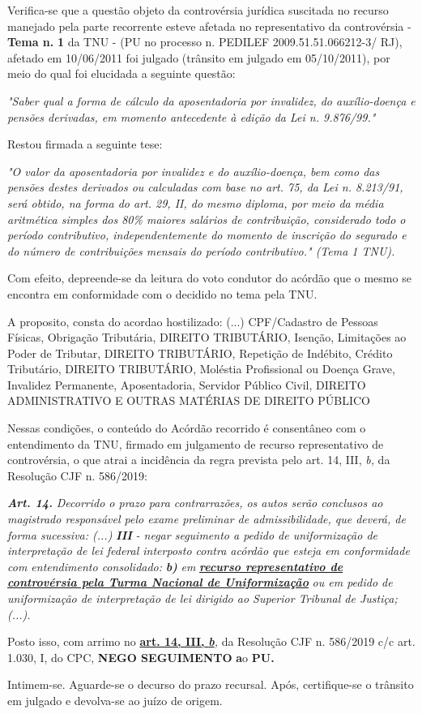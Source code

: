 \documentclass[12pt]{article}
\begin{document}
\justifying
\noindent Verifica-se que a questão objeto da controvérsia jurídica suscitada no recurso manejado pela parte recorrente esteve afetada no representativo da controvérsia - \textbf{Tema n. }\textbf{1} da TNU - (PU no processo n. PEDILEF 2009.51.51.066212-3/ RJ),  afetado em 10/06/2011 foi julgado (trânsito em julgado em 05/10/2011), por meio do qual foi elucidada a seguinte questão:

\noindent \textit{"Saber qual a forma de cálculo da aposentadoria por invalidez, do auxílio-doença e pensões derivadas, em momento antecedente à edição da Lei n. 9.876/99."}

\noindent Restou firmada a seguinte tese:

\noindent \textit{"O valor da aposentadoria por invalidez e do auxílio-doença, bem como das pensões destes derivados ou calculadas com base no art. 75, da Lei n. 8.213/91, será obtido, na forma do art. 29, II, do mesmo diploma, por meio da média aritmética simples dos 80\% maiores salários de contribuição, considerado todo o período contributivo, independentemente do momento de inscrição do segurado e do número de contribuições mensais do período contributivo." (Tema 1 TNU).}

\noindent Com efeito, depreende-se da leitura do voto condutor do acórdão que o mesmo se encontra em conformidade com o decidido no  tema pela TNU.

\noindent A proposito, consta do acordao hostilizado: (...) CPF/Cadastro de Pessoas Físicas, Obrigação Tributária, DIREITO TRIBUTÁRIO, Isenção, Limitações ao Poder de Tributar, DIREITO TRIBUTÁRIO, Repetição de Indébito, Crédito Tributário, DIREITO TRIBUTÁRIO, Moléstia Profissional ou Doença Grave, Invalidez Permanente, Aposentadoria, Servidor Público Civil, DIREITO ADMINISTRATIVO E OUTRAS MATÉRIAS DE DIREITO PÚBLICO

\noindent Nessas condições, o conteúdo do Acórdão recorrido é consentâneo com o entendimento da TNU, firmado em julgamento de recurso representativo de controvérsia, o que atrai a incidência da regra prevista pelo art. 14, III, \textit{b,} da Resolução CJF n. 586/2019:

\noindent \textit{\textbf{Art. 14.}}\textit{ Decorrido o prazo para contrarrazões, os autos serão conclusos ao magistrado responsável pelo exame preliminar de admissibilidade, que deverá, de forma sucessiva: (...) }\textit{\textbf{III }}\textit{- negar seguimento a pedido de uniformização de interpretação de lei federal interposto contra acórdão que esteja em conformidade com entendimento consolidado: }\textit{\textbf{b)}}\textit{ em }\uline{\textit{\textbf{recurso representativo de controvérsia pela Turma Nacional de Uniformização}}}\textit{ ou em pedido de uniformização de interpretação de lei dirigido ao Superior Tribunal de Justiça;(...).}

\noindent Posto isso, com arrimo no \uline{\textbf{art. 14, III, }}\uline{\textit{\textbf{b}}}\textit{,} da Resolução CJF n. 586/2019 c/c art. 1.030, I, do CPC, \textbf{NEGO SEGUIMENTO }\textbf{a}o\textbf{ PU}\textbf{.}

\noindent Intimem-se. Aguarde-se o decurso do prazo recursal. Após, certifique-se o trânsito em julgado e devolva-se ao juízo de origem.
\end{document}
